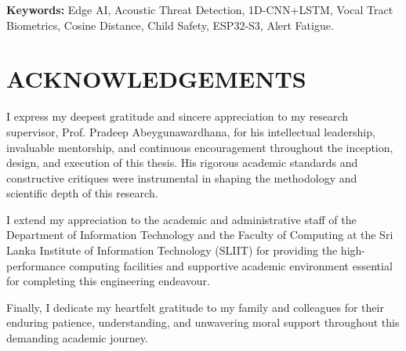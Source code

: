 \documentclass[12pt, a4paper]{report}
\begin{document}
\noindent \textbf{Keywords:} Edge AI, Acoustic Threat Detection, 1D-CNN+LSTM, Vocal Tract Biometrics, Cosine Distance, Child Safety, ESP32-S3, Alert Fatigue.

\clearpage

\chapter*{ACKNOWLEDGEMENTS}
I express my deepest gratitude and sincere appreciation to my research supervisor, Prof. Pradeep Abeygunawardhana, for his intellectual leadership, invaluable mentorship, and continuous encouragement throughout the inception, design, and execution of this thesis. His rigorous academic standards and constructive critiques were instrumental in shaping the methodology and scientific depth of this research.

I extend my appreciation to the academic and administrative staff of the Department of Information Technology and the Faculty of Computing at the Sri Lanka Institute of Information Technology (SLIIT) for providing the high-performance computing facilities and supportive academic environment essential for completing this engineering endeavour.

Finally, I dedicate my heartfelt gratitude to my family and colleagues for their enduring patience, understanding, and unwavering moral support throughout this demanding academic journey.

\clearpage

\tableofcontents
\listoffigures
\listoftables

\clearpage
\end{document}
